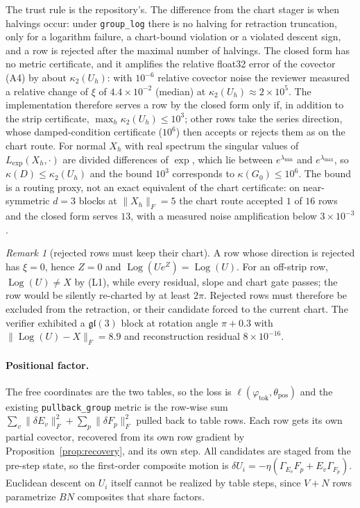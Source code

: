 \documentclass[11pt]{article}
\theoremstyle{definition}
\theoremstyle{remark}
\newtheorem{remark}[theorem]{Remark}
\newcommand{\gl}{\mathfrak{gl}}
\newcommand{\Log}{\operatorname{Log}}
\begin{document}
The trust rule is the repository's. The difference from the chart stager is when halvings occur: under \texttt{group\_log} there is no halving for retraction truncation, only for a logarithm failure, a chart-bound violation or a violated descent sign, and a row is rejected after the maximal number of halvings. The closed form has no metric certificate, and it amplifies the relative float32 error of the covector (A4) by about $\kappa_2(U_h)$: with $10^{-6}$ relative covector noise the reviewer measured a relative change of $\xi$ of $4.4\times10^{-2}$ (median) at $\kappa_2(U_h)\approx2\times10^5$. The implementation therefore serves a row by the closed form only if, in addition to the strip certificate, $\max_h\kappa_2(U_h)\le10^3$; other rows take the series direction, whose damped-condition certificate ($10^6$) then accepts or rejects them as on the chart route. For normal $X_h$ with real spectrum the singular values of $L_{\exp}(X_h,\cdot)$ are divided differences of $\exp$, which lie between $e^{\lambda_{\min}}$ and $e^{\lambda_{\max}}$, so $\kappa(D)\le\kappa_2(U_h)$ and the bound $10^3$ corresponds to $\kappa(G_0)\le10^6$. The bound is a routing proxy, not an exact equivalent of the chart certificate: on near-symmetric $d=3$ blocks at $\|X_h\|_F=5$ the chart route accepted $1$ of $16$ rows and the closed form serves $13$, with a measured noise amplification below $3\times10^{-3}$.

\begin{remark}[rejected rows must keep their chart]\label{rem:rejected}
A row whose direction is rejected has $\xi=0$, hence $Z=0$ and $\Log(Ue^{Z})=\Log(U)$. For an off-strip row, $\Log(U)\neq X$ by (L1), while every residual, slope and chart gate passes; the row would be silently re-charted by at least $2\pi$. Rejected rows must therefore be excluded from the retraction, or their candidate forced to the current chart. The verifier exhibited a $\gl(3)$ block at rotation angle $\pi+0.3$ with $\|\Log(U)-X\|_F=8.9$ and reconstruction residual $8\times10^{-16}$.
\end{remark}

\paragraph{Positional factor.} The free coordinates are the two tables, so the loss is $\ell(\varphi_{\mathrm{tok}},\theta_{\mathrm{pos}})$ and the existing \texttt{pullback\_group} metric is the row-wise sum $\sum_v\|\delta E_v\|_F^2+\sum_p\|\delta F_p\|_F^2$ pulled back to table rows. Each row gets its own partial covector, recovered from its own row gradient by Proposition~\ref{prop:recovery}, and its own step. All candidates are staged from the pre-step state, so the first-order composite motion is $\delta U_i=-\eta(\Gamma_{E_v}F_{p}+E_v\Gamma_{F_p})$. Euclidean descent on $U_i$ itself cannot be realized by table steps, since $V+N$ rows parametrize $BN$ composites that share factors.
\end{document}
